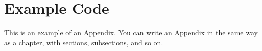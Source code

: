 
\chapter{Example Code}
This is an example of an Appendix. You can write an Appendix in the same way as a chapter, with sections, subsections, and so on.

